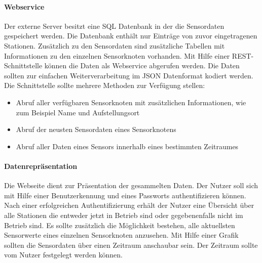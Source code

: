 \paragraph{Webservice}
Der externe Server besitzt eine \ac{SQL} Datenbank in der die Sensordaten gespeichert werden. Die Datenbank enthält nur Einträge von zuvor eingetragenen Stationen. Zusätzlich zu den Sensordaten sind zusätzliche Tabellen mit Informationen zu den einzelnen Sensorknoten vorhanden. Mit Hilfe einer \ac{REST}-Schnittstelle können die Daten als Webservice abgerufen werden. Die Daten sollten zur einfachen Weiterverarbeitung im \ac{JSON} Datenformat kodiert werden. Die Schnittstelle sollte mehrere Methoden zur Verfügung stellen:
\begin{itemize}
	\item Abruf aller verfügbaren Sensorknoten mit zusätzlichen Informationen, wie zum Beispiel Name und Aufstellungsort
	\item Abruf der neusten Sensordaten eines Sensorknotens
	\item Abruf aller Daten eines Sensors innerhalb eines bestimmten Zeitraumes
\end{itemize}
\paragraph{Datenrepräsentation} Die Webseite dient zur Präsentation der gesammelten Daten. Der Nutzer soll sich mit Hilfe einer Benutzerkennung und eines Passworts authentifizieren können. Nach einer erfolgreichen Authentifizierung erhält der Nutzer eine Übersicht über alle Stationen die entweder jetzt in Betrieb sind oder gegebenenfalls nicht im Betrieb sind. Es sollte zusätzlich die Möglichkeit bestehen, alle aktuellsten Sensorwerte eines einzelnen Sensorknoten anzusehen. Mit Hilfe einer Grafik sollten die Sensordaten über einen Zeitraum anschaubar sein. Der Zeitraum sollte vom Nutzer festgelegt werden können.
